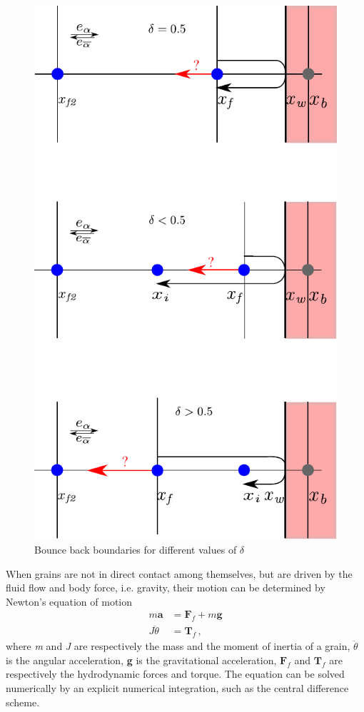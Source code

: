 \begin{figure}[htbp]
\centering
\includegraphics[height=0.9\textheight]{bouncemod}
\caption{Bounce back boundaries for different values of $\delta$}
\label{fig:bouncemod}
\end{figure}

When grains are not in direct contact among themselves, but are driven by 
the fluid flow and body force, i.e. gravity, their motion can be determined by 
Newton's equation of motion
%
\begin{align}
\mathit{m}\mathbf{ a} & = \mathbf{F}_{f} + \mathit{m }\mathbf{g} \\
\mathit{J } \ddot{\theta} & = \mathbf{T}_{f} \,,
\end{align}
%
\noindent where \textit{m} and \textit{J} are respectively the mass and the 
moment of inertia of a grain, $\ddot{\theta}$ is the 
angular acceleration, \textbf{g} is the gravitational acceleration,
$\mathbf{F}_{f}$ and $\mathbf{T}_{f}$ are respectively the hydrodynamic forces 
and torque. The equation can be solved numerically by an explicit numerical 
integration, such as the central difference scheme. 

